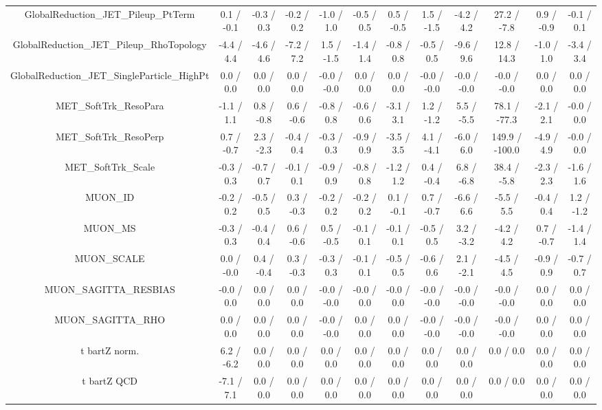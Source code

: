 \begin{table}[htbp]
\begin{center}
\begin{tabular}{|c|c|c|c|c|c|c|c|c|c|c|c|}
  GlobalReduction_JET_Pileup_PtTerm & 0.1 / -0.1 & -0.3 / 0.3 & -0.2 / 0.2 & -1.0 / 1.0 & -0.5 / 0.5 & 0.5 / -0.5 & 1.5 / -1.5 & -4.2 / 4.2 & 27.2 / -7.8 & 0.9 / -0.9 & -0.1 / 0.1 \\ 
  GlobalReduction_JET_Pileup_RhoTopology & -4.4 / 4.4 & -4.6 / 4.6 & -7.2 / 7.2 & 1.5 / -1.5 & -1.4 / 1.4 & -0.8 / 0.8 & -0.5 / 0.5 & -9.6 / 9.6 & 12.8 / 14.3 & -1.0 / 1.0 & -3.4 / 3.4 \\ 
  GlobalReduction_JET_SingleParticle_HighPt & 0.0 / 0.0 & 0.0 / 0.0 & 0.0 / 0.0 & -0.0 / -0.0 & 0.0 / 0.0 & 0.0 / 0.0 & -0.0 / -0.0 & -0.0 / -0.0 & -0.0 / -0.0 & 0.0 / 0.0 & 0.0 / 0.0 \\ 
  MET_SoftTrk_ResoPara & -1.1 / 1.1 & 0.8 / -0.8 & 0.6 / -0.6 & -0.8 / 0.8 & -0.6 / 0.6 & -3.1 / 3.1 & 1.2 / -1.2 & 5.5 / -5.5 & 78.1 / -77.3 & -2.1 / 2.1 & -0.0 / 0.0 \\ 
  MET_SoftTrk_ResoPerp & 0.7 / -0.7 & 2.3 / -2.3 & -0.4 / 0.4 & -0.3 / 0.3 & -0.9 / 0.9 & -3.5 / 3.5 & 4.1 / -4.1 & -6.0 / 6.0 & 149.9 / -100.0 & -4.9 / 4.9 & -0.0 / 0.0 \\ 
  MET_SoftTrk_Scale & -0.3 / 0.3 & -0.7 / 0.7 & -0.1 / 0.1 & -0.9 / 0.9 & -0.8 / 0.8 & -1.2 / 1.2 & 0.4 / -0.4 & 6.8 / -6.8 & 38.4 / -5.8 & -2.3 / 2.3 & -1.6 / 1.6 \\ 
  MUON_ID & -0.2 / 0.2 & -0.5 / 0.5 & 0.3 / -0.3 & -0.2 / 0.2 & -0.2 / 0.2 & 0.1 / -0.1 & 0.7 / -0.7 & -6.6 / 6.6 & -5.5 / 5.5 & -0.4 / 0.4 & 1.2 / -1.2 \\ 
  MUON_MS & -0.3 / 0.3 & -0.4 / 0.4 & 0.6 / -0.6 & 0.5 / -0.5 & -0.1 / 0.1 & -0.1 / 0.1 & -0.5 / 0.5 & 3.2 / -3.2 & -4.2 / 4.2 & 0.7 / -0.7 & -1.4 / 1.4 \\ 
  MUON_SCALE & 0.0 / -0.0 & 0.4 / -0.4 & 0.3 / -0.3 & -0.3 / 0.3 & -0.1 / 0.1 & -0.5 / 0.5 & -0.6 / 0.6 & 2.1 / -2.1 & -4.5 / 4.5 & -0.9 / 0.9 & -0.7 / 0.7 \\ 
  MUON_SAGITTA_RESBIAS & -0.0 / 0.0 & 0.0 / 0.0 & 0.0 / 0.0 & -0.0 / -0.0 & -0.0 / 0.0 & -0.0 / 0.0 & -0.0 / -0.0 & -0.0 / -0.0 & -0.0 / -0.0 & 0.0 / 0.0 & 0.0 / 0.0 \\ 
  MUON_SAGITTA_RHO & 0.0 / 0.0 & 0.0 / 0.0 & 0.0 / 0.0 & -0.0 / -0.0 & 0.0 / 0.0 & 0.0 / 0.0 & -0.0 / -0.0 & -0.0 / -0.0 & -0.0 / -0.0 & 0.0 / 0.0 & 0.0 / 0.0 \\ 
  t bar{t}Z norm. & 6.2 / -6.2 & 0.0 / 0.0 & 0.0 / 0.0 & 0.0 / 0.0 & 0.0 / 0.0 & 0.0 / 0.0 & 0.0 / 0.0 & 0.0 / 0.0 & 0.0 / 0.0 & 0.0 / 0.0 & 0.0 / 0.0 \\ 
  t bar{t}Z QCD & -7.1 / 7.1 & 0.0 / 0.0 & 0.0 / 0.0 & 0.0 / 0.0 & 0.0 / 0.0 & 0.0 / 0.0 & 0.0 / 0.0 & 0.0 / 0.0 & 0.0 / 0.0 & 0.0 / 0.0 & 0.0 / 0.0 \\ 

\end{tabular}
\end{center}
\end{table}
